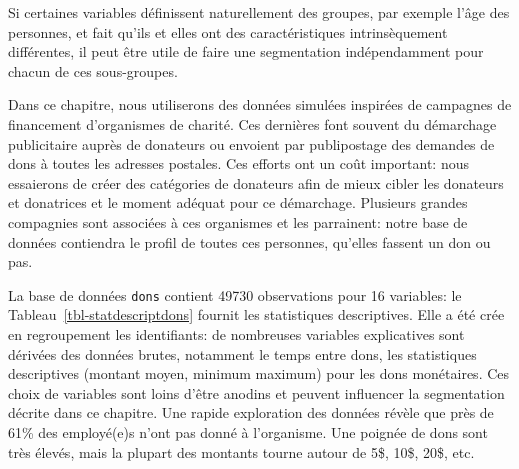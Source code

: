\documentclass[
  11pt,
  letterpaper,
]{book}
\theoremstyle{definition}
\theoremstyle{remark}
\begin{document}
Si certaines variables définissent naturellement des groupes, par
exemple l'âge des personnes, et fait qu'ils et elles ont des
caractéristiques intrinsèquement différentes, il peut être utile de
faire une segmentation indépendamment pour chacun de ces sous-groupes.

Dans ce chapitre, nous utiliserons des données simulées inspirées de
campagnes de financement d'organismes de charité. Ces dernières font
souvent du démarchage publicitaire auprès de donateurs ou envoient par
publipostage des demandes de dons à toutes les adresses postales. Ces
efforts ont un coût important: nous essaierons de créer des catégories
de donateurs afin de mieux cibler les donateurs et donatrices et le
moment adéquat pour ce démarchage. Plusieurs grandes compagnies sont
associées à ces organismes et les parrainent: notre base de données
contiendra le profil de toutes ces personnes, qu'elles fassent un don ou
pas.

La base de données \texttt{dons} contient 49730 observations pour 16
variables: le Tableau~\ref{tbl-statdescriptdons} fournit les
statistiques descriptives. Elle a été crée en regroupement les
identifiants: de nombreuses variables explicatives sont dérivées des
données brutes, notamment le temps entre dons, les statistiques
descriptives (montant moyen, minimum maximum) pour les dons monétaires.
Ces choix de variables sont loins d'être anodins et peuvent influencer
la segmentation décrite dans ce chapitre. Une rapide exploration des
données révèle que près de 61\% des employé(e)s n'ont pas donné à
l'organisme. Une poignée de dons sont très élevés, mais la plupart des
montants tourne autour de 5\$, 10\$, 20\$, etc.
\end{document}
